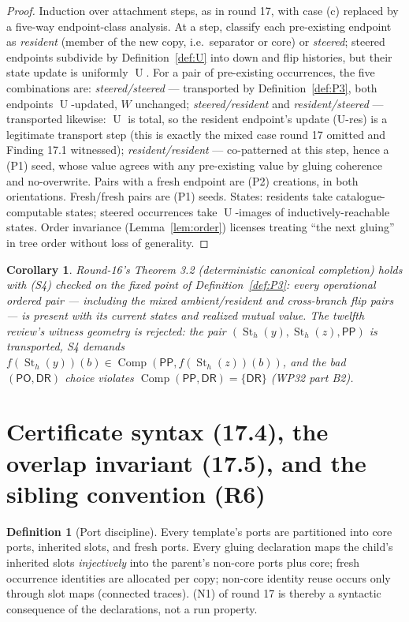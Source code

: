 \documentclass[11pt]{article}
\newtheorem{corollary}[theorem]{Corollary}
\theoremstyle{definition}
\newtheorem{definition}[theorem]{Definition}
\newcommand{\PP}{\mathsf{PP}}
\newcommand{\PO}{\mathsf{PO}}
\newcommand{\DR}{\mathsf{DR}}
\newcommand{\Comp}{\operatorname{Comp}}
\newcommand{\St}{\operatorname{St}}
\newcommand{\U}{\operatorname{U}}
\begin{document}
\begin{proof}
Induction over attachment steps, as in round 17, with case (c) replaced
by a five-way endpoint-class analysis.  At a step, classify each
pre-existing endpoint as \emph{resident} (member of the new copy, i.e.\
separator or core) or \emph{steered}; steered endpoints subdivide by
Definition~\ref{def:U} into down and flip histories, but their state
update is uniformly $\U$.  For a pair of pre-existing occurrences, the
five combinations are:
\emph{steered/steered} --- transported by Definition~\ref{def:P3},
both endpoints $\U$-updated, $W$ unchanged;
\emph{steered/resident} and \emph{resident/steered} --- transported
likewise: $\U$ is total, so the resident endpoint's update (U-res) is a
legitimate transport step (this is exactly the mixed case round 17
omitted and Finding 17.1 witnessed);
\emph{resident/resident} --- co-patterned at this step, hence a (P1)
seed, whose value agrees with any pre-existing value by gluing
coherence and no-overwrite.
Pairs with a fresh endpoint are (P2) creations, in both orientations.
Fresh/fresh pairs are (P1) seeds.  States: residents take
catalogue-computable states; steered occurrences take
$\U$-images of inductively-reachable states.  Order invariance
(Lemma~\ref{lem:order}) licenses treating ``the next gluing'' in tree
order without loss of generality.
\end{proof}

\begin{corollary}
Round-16's Theorem 3.2 (deterministic canonical completion) holds with
(S4) checked on the fixed point of Definition~\ref{def:P3}: every
operational ordered pair --- including the mixed ambient/resident and
cross-branch flip pairs --- is present with its current states and
realized mutual value.  The twelfth review's witness geometry is
rejected: the pair $(\St_h(y),\St_h(z),\PP)$ is transported, S4 demands
$f(\St_h(y))(b)\in\Comp(\PP,f(\St_h(z))(b))$, and the bad $(\PO,\DR)$
choice violates $\Comp(\PP,\DR)=\{\DR\}$ (WP32 part B2).
\end{corollary}

\section{Certificate syntax (17.4), the overlap invariant (17.5), and
the sibling convention (R6)}\label{sec:syntax}

\begin{definition}[Port discipline]\label{def:ports}
Every template's ports are partitioned into core ports, inherited
slots, and fresh ports.  Every gluing declaration maps the child's
inherited slots \emph{injectively} into the parent's non-core ports
plus core; fresh occurrence identities are allocated per copy; non-core
identity reuse occurs only through slot maps (connected traces).  (N1)
of round 17 is thereby a syntactic consequence of the declarations, not
a run property.
\end{definition}
\end{document}
